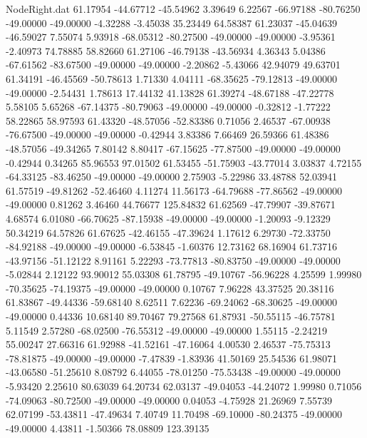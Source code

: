 \begin{filecontents}{NodeRight.dat}
  61.17954  -44.67712  -45.54962     3.39649    6.22567  -66.97188  -80.76250  -49.00000  -49.00000   -4.32288   -3.45038   35.23449   64.58387
  61.23037  -45.04639  -46.59027     7.55074    5.93918  -68.05312  -80.27500  -49.00000  -49.00000   -3.95361   -2.40973   74.78885   58.82660
  61.27106  -46.79138  -43.56934     4.36343    5.04386  -67.61562  -83.67500  -49.00000  -49.00000   -2.20862   -5.43066   42.94079   49.63701
  61.34191  -46.45569  -50.78613     1.71330    4.04111  -68.35625  -79.12813  -49.00000  -49.00000   -2.54431    1.78613   17.44132   41.13828
  61.39274  -48.67188  -47.22778     5.58105    5.65268  -67.14375  -80.79063  -49.00000  -49.00000   -0.32812   -1.77222   58.22865   58.97593
  61.43320  -48.57056  -52.83386     0.71056    2.46537  -67.00938  -76.67500  -49.00000  -49.00000   -0.42944    3.83386    7.66469   26.59366
  61.48386  -48.57056  -49.34265     7.80142    8.80417  -67.15625  -77.87500  -49.00000  -49.00000   -0.42944    0.34265   85.96553   97.01502
  61.53455  -51.75903  -43.77014     3.03837    4.72155  -64.33125  -83.46250  -49.00000  -49.00000    2.75903   -5.22986   33.48788   52.03941
  61.57519  -49.81262  -52.46460     4.11274   11.56173  -64.79688  -77.86562  -49.00000  -49.00000    0.81262    3.46460   44.76677  125.84832
  61.62569  -47.79907  -39.87671     4.68574    6.01080  -66.70625  -87.15938  -49.00000  -49.00000   -1.20093   -9.12329   50.34219   64.57826
  61.67625  -42.46155  -47.39624     1.17612    6.29730  -72.33750  -84.92188  -49.00000  -49.00000   -6.53845   -1.60376   12.73162   68.16904
  61.73716  -43.97156  -51.12122     8.91161    5.22293  -73.77813  -80.83750  -49.00000  -49.00000   -5.02844    2.12122   93.90012   55.03308
  61.78795  -49.10767  -56.96228     4.25599    1.99980  -70.35625  -74.19375  -49.00000  -49.00000    0.10767    7.96228   43.37525   20.38116
  61.83867  -49.44336  -59.68140     8.62511    7.62236  -69.24062  -68.30625  -49.00000  -49.00000    0.44336   10.68140   89.70467   79.27568
  61.87931  -50.55115  -46.75781     5.11549    2.57280  -68.02500  -76.55312  -49.00000  -49.00000    1.55115   -2.24219   55.00247   27.66316
  61.92988  -41.52161  -47.16064     4.00530    2.46537  -75.75313  -78.81875  -49.00000  -49.00000   -7.47839   -1.83936   41.50169   25.54536
  61.98071  -43.06580  -51.25610     8.08792    6.44055  -78.01250  -75.53438  -49.00000  -49.00000   -5.93420    2.25610   80.63039   64.20734
  62.03137  -49.04053  -44.24072     1.99980    0.71056  -74.09063  -80.72500  -49.00000  -49.00000    0.04053   -4.75928   21.26969    7.55739
  62.07199  -53.43811  -47.49634     7.40749   11.70498  -69.10000  -80.24375  -49.00000  -49.00000    4.43811   -1.50366   78.08809  123.39135

\end{filecontents}
